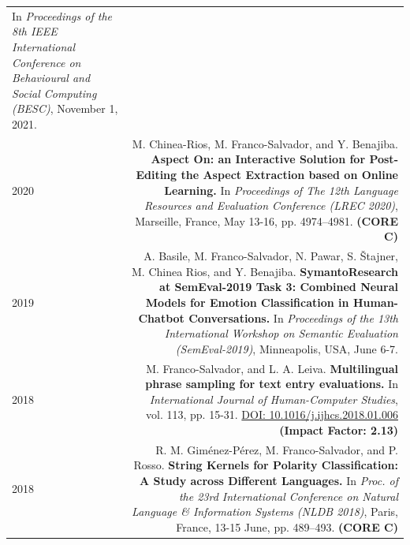 \documentclass[10pt]{article}
\begin{document}
\begin{tabular}{L!{\VRule}R}
	In \emph{Proceedings of the 8th IEEE International Conference on Behavioural and Social Computing (BESC)}, November 1, 2021.\vspace{5pt}\\
	2020 & M. Chinea-Rios, M. Franco-Salvador, and Y. Benajiba. \textbf{Aspect On: an Interactive Solution for Post-Editing the Aspect Extraction based on Online Learning.}
	In \emph{Proceedings of The 12th Language Resources and Evaluation Conference (LREC 2020)}, Marseille, France, May 13-16, pp. 4974--4981. 	\textbf{(CORE C)}\vspace{5pt}\\
	2019 & A. Basile, M. Franco-Salvador, N. Pawar, S. \v{S}tajner, M. Chinea Rios, and Y. Benajiba. \textbf{SymantoResearch at SemEval-2019 Task 3: Combined Neural Models for Emotion Classification in Human-Chatbot Conversations.}
	In \emph{Proceedings of the 13th International Workshop on Semantic Evaluation (SemEval-2019)}, Minneapolis, USA, June 6-7.\vspace{5pt}\\
	2018 & M. Franco-Salvador, and L. A. Leiva. \textbf{Multilingual phrase sampling for text entry evaluations.}
	In \emph{International Journal of Human-Computer Studies}, vol. 113, pp. 15-31. \href{https://doi.org/10.1016/j.ijhcs.2018.01.006}{DOI: 10.1016/j.ijhcs.2018.01.006} \textbf{(Impact Factor: 2.13)} \vspace{5pt}\\	
	2018& R. M. Gim{\'e}nez-P{\'e}rez, M. Franco-Salvador, and P. Rosso. \textbf{String Kernels for Polarity Classification: A Study across Different Languages.}
	In \emph{Proc. of the 23rd International Conference on Natural Language \& Information Systems (NLDB 2018)}, Paris, France, 13-15 June, pp. 489--493. \textbf{(CORE C)}\vspace{5pt}\\
\end{tabular}
\end{document}
